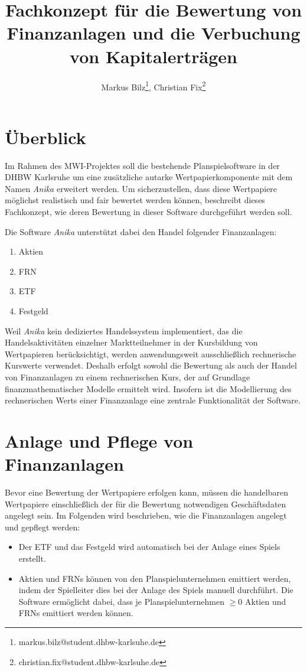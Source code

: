 \documentclass[12pt, a4paper]{article}
\title{Fachkonzept für die Bewertung von Finanzanlagen und die Verbuchung von Kapitalerträgen}
\author{Markus Bilz\thanks{markus.bilz@student.dhbw-karlsuhe.de}, Christian Fix\thanks{christian.fix@student.dhbw-karlsuhe.de}}
\theoremstyle{plain}
\begin{document}
\maketitle

\section{Überblick}
Im Rahmen des MWI-Projektes soll die bestehende Planspielsoftware in der DHBW Karlsruhe um eine zusätzliche autarke Wertpapierkomponente mit dem Namen \textit{Anika} erweitert werden.
Um sicherzustellen, dass diese Wertpapiere möglichst realistisch und fair bewertet werden können, beschreibt dieses Fachkonzept, wie deren Bewertung in dieser Software durchgeführt werden soll.

Die Software \textit{Anika} unterstützt dabei den Handel folgender Finanzanlagen:
\begin{enumerate}
	\item Aktien
	\item \gls{FRN}
	\item \gls{ETF}
	\item Festgeld
\end{enumerate}

Weil \textit{Anika} kein dediziertes Handelssystem implementiert, das die Handelsaktivitäten einzelner Marktteilnehmer in der Kursbildung von Wertpapieren berücksichtigt, werden anwendungsweit ausschließlich rechnerische Kurswerte verwendet. 
Deshalb erfolgt sowohl die Bewertung als auch der Handel von Finanzanlagen zu einem rechnerischen Kurs, der auf Grundlage finanzmathematischer Modelle ermittelt wird.
Insofern ist die Modellierung des rechnerischen Werts einer Finanzanlage eine zentrale Funktionalität der Software.


\section{Anlage und Pflege von Finanzanlagen}
\label{sec:anlage_und_pflege_der_wertpapiere}

Bevor eine Bewertung der Wertpapiere erfolgen kann, müssen die handelbaren Wertpapiere einschließlich der für die Bewertung notwendigen Geschäftsdaten angelegt sein. 
Im Folgenden wird beschrieben, wie die Finanzanlagen angelegt und gepflegt werden:
\begin{itemize}
	\item Der \gls{ETF} und das Festgeld wird automatisch bei der Anlage eines Spiels erstellt.
	\item Aktien und \glspl{FRN} können von den Planspielunternehmen emittiert werden, indem der Spielleiter dies bei der Anlage des Spiels manuell durchführt. Die Software ermöglicht dabei, dass je Planspielunternehmen $\geq 0$ Aktien und \glspl{FRN} emittiert werden können. 
\end{itemize}
\end{document}
